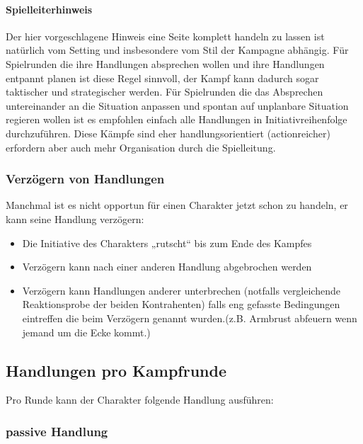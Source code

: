 \documentclass{article}
\begin{document}
\begin{mdframed}[hidealllines=true, backgroundcolor=black!10]
\paragraph{Spielleiterhinweis}

Der hier vorgeschlagene Hinweis eine Seite komplett handeln zu lassen ist natürlich vom Setting und insbesondere
vom Stil der Kampagne abhängig. Für Spielrunden die ihre Handlungen absprechen wollen und ihre Handlungen
entpannt planen ist diese Regel sinnvoll, der Kampf kann dadurch sogar taktischer und strategischer werden. Für
Spielrunden die das Absprechen untereinander an die Situation anpassen und spontan auf unplanbare Situation regieren
wollen ist es empfohlen einfach alle Handlungen in Initiativreihenfolge durchzuführen. Diese Kämpfe sind eher
handlungsorientiert (actionreicher) erfordern aber auch mehr Organisation durch die Spielleitung.

\end{mdframed}
\subsubsection{Verzögern von Handlungen}

Manchmal ist es nicht opportun für einen Charakter jetzt schon zu handeln, er kann seine Handlung verzögern:

\begin{itemize}
\item Die Initiative des Charakters „rutscht“ bis zum Ende des Kampfes
\item Verzögern kann nach einer anderen Handlung abgebrochen werden
\item Verzögern kann Handlungen anderer unterbrechen (notfalls vergleichende Reaktionsprobe der beiden Kontrahenten) falls eng gefasste Bedingungen eintreffen die beim Verzögern genannt wurden.(z.B. Armbrust abfeuern wenn jemand um die Ecke kommt.)
\end{itemize}

\begin{center}
\subsection{Handlungen pro Kampfrunde}
\end{center}

Pro Runde kann der Charakter folgende Handlung ausführen:

\subsubsection{passive Handlung}
\end{document}
